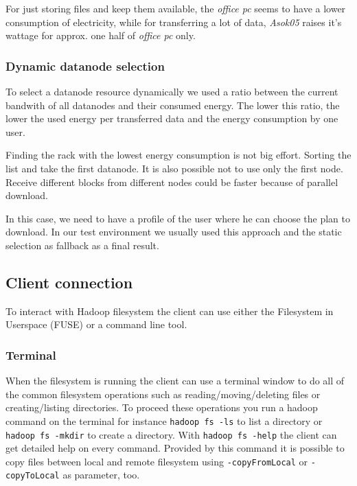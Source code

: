 For just storing files and keep them available, the \textit{office pc} seems to have a lower consumption of electricity, while for transferring a lot of data, \textit{Asok05} raises it's wattage for approx. one half of \textit{office pc} only.

\subsubsection{Dynamic datanode selection}

To select a datanode resource dynamically we used a ratio between the current bandwith of all datanodes and their consumed energy. The lower this ratio, the lower the used energy per transferred data and the energy consumption by one user.

Finding the rack with the lowest energy consumption is not big effort. Sorting the list and take the first datanode. It is also possible not to use only the first node. Receive different blocks from different nodes could be faster because of parallel download.

In this case, we need to have a profile of the user where he can choose the plan to download. In our test environment we usually used this approach and the static selection as fallback as a final result.

\subsection{Client connection}
\label{sec:hdfs_client}

To interact with Hadoop filesystem the client can use either the Filesystem in Userspace (FUSE) or a command line tool.

\subsubsection{Terminal}

When the filesystem is running the client can use a terminal window to do all of the common filesystem operations such as reading/moving/deleting files or creating/listing directories. To proceed these operations you run a hadoop command on the terminal for instance \texttt{hadoop fs -ls} to list a directory or \texttt{hadoop fs -mkdir} to create a directory. With \texttt{hadoop fs -help} the client can get detailed help on every command. 
Provided by this command it is possible to copy files between local and remote filesystem using \texttt{-copyFromLocal} or \texttt{-copyToLocal} as parameter, too.

